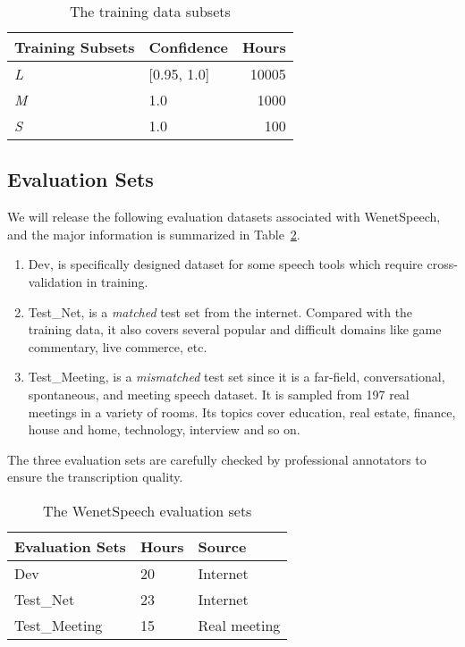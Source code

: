 \documentclass{article}
\begin{document}
\vspace{-0.5em}
\begin{table}[t]
\caption{The training data subsets}
\label{tab:training_subsets}
\centering
\begin{tabular}{@{}llr@{}}
\toprule[2pt]
Training Subsets & Confidence  & Hours \\
\midrule[1pt]
\textit{L}       & [0.95, 1.0] & 10005 \\
\textit{M}       & 1.0         & 1000  \\
\textit{S}       & 1.0         & 100   \\ \bottomrule[2pt]
\end{tabular}
\vspace{-1.5em}
\end{table}

\vspace{-1.1em}
\subsection{Evaluation Sets}
\vspace{-0.5em}
We will release the following evaluation datasets associated with WenetSpeech, and the major information is summarized in Table~\ref{tab:evaluation_sets}.
\begin{enumerate}
    \setlength{\itemsep}{0pt}
    \vspace{-0.5em}
    \item Dev, is specifically designed dataset for some speech tools which require cross-validation in training.
    \vspace{-0.2em}
    \item Test\_Net, is a \textit{matched} test set from the internet. Compared with the training data, it also covers several popular and difficult domains like game commentary, live commerce, etc.
    \vspace{-0.3em}
    \item Test\_Meeting, is a \textit{mismatched} test set since it is a far-field, conversational, spontaneous, and meeting speech dataset. It is sampled from 197 real meetings in a variety of rooms. Its topics cover education, real estate, finance, house and home, technology, interview and so on.
\vspace{-0.5em}
\end{enumerate}
The three evaluation sets are carefully checked by professional annotators to ensure the transcription quality.


\begin{table}[t]
\caption{The WenetSpeech evaluation sets}
\label{tab:evaluation_sets}
\centering
\begin{tabular}{@{}lll@{}}
\toprule[2pt]
Evaluation Sets & Hours & Source       \\
\midrule[1pt]
Dev             & 20    & Internet     \\
Test\_Net       & 23    & Internet     \\
Test\_Meeting   & 15    & Real meeting \\ \bottomrule[2pt]
\end{tabular}
\vspace{-1.5em}
\end{table}
\end{document}
